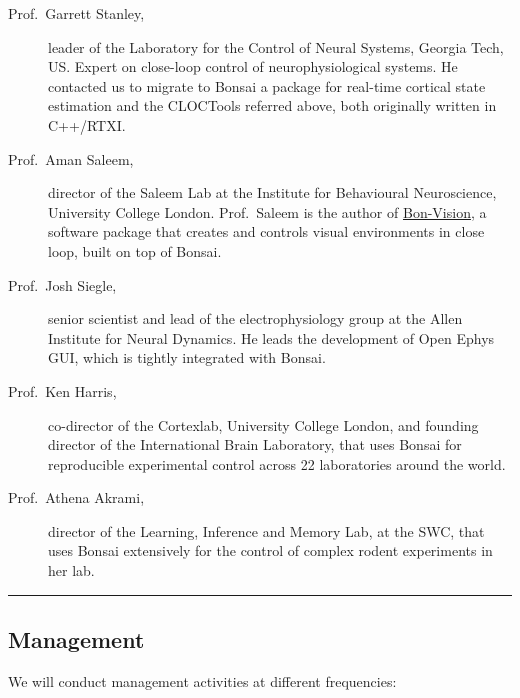 \begin{description}

    \item[Prof.~Garrett Stanley,] leader of the Laboratory for the Control of
        Neural Systems, Georgia Tech, US. Expert on close-loop control of
        neurophysiological systems. He contacted us to migrate to Bonsai
        a package for real-time cortical state estimation and the CLOCTools
        referred above, both originally written in C++/RTXI.

    \item[Prof.~Aman Saleem,] director of the Saleem Lab at the Institute for
        Behavioural Neuroscience, University College London. Prof.~Saleem is the
        author of \href{https://bonvision.github.io/}{Bon-Vision}, a software
        package that creates and controls visual environments in close loop,
        built on top of Bonsai.

    \item[Prof.~Josh Siegle,] senior scientist and lead of the
        electrophysiology group at the Allen Institute for Neural Dynamics. He
        leads the development of Open Ephys GUI, which is tightly integrated
        with Bonsai.

    \item[Prof.~Ken Harris,] co-director of the Cortexlab, University College
        London, and founding director of the International Brain Laboratory,
        that uses Bonsai for reproducible experimental control across 22
        laboratories around the world.

    \item[Prof.~Athena Akrami,] director of the Learning, Inference and Memory
        Lab, at the SWC, that uses Bonsai extensively for the control of
        complex rodent experiments in her lab.

\end{description}

\noindent\rule{\textwidth}{1pt}
\subsection{Management}

We will conduct management activities at different frequencies:

